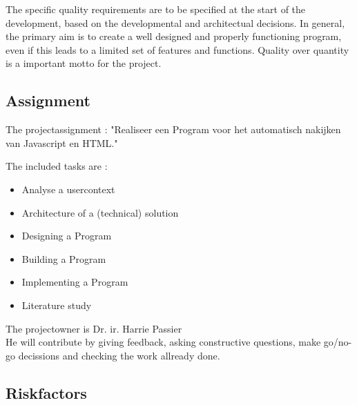 \documentclass{article}
\begin{document}
The specific quality requirements are to be specified at the start of the development, based on the developmental and architectual decisions. In general, the primary aim is to create a well designed and properly functioning program, even if this leads to a limited set of features and functions. Quality over quantity is a important motto for the project.

\subsection{Assignment}

The projectassignment : "Realiseer een Program voor het automatisch nakijken van Javascript en HTML."

The included tasks are :
\begin{itemize}
  \item Analyse a usercontext
  \item Architecture of a (technical) solution
  \item Designing a Program
  \item Building a Program
  \item Implementing a Program
  \item Literature study
\end{itemize}

The projectowner is Dr. ir. Harrie Passier\\
He will contribute by giving feedback, asking constructive questions, make go/no-go decissions and checking the work allready done.

\subsection{Riskfactors}
\end{document}

